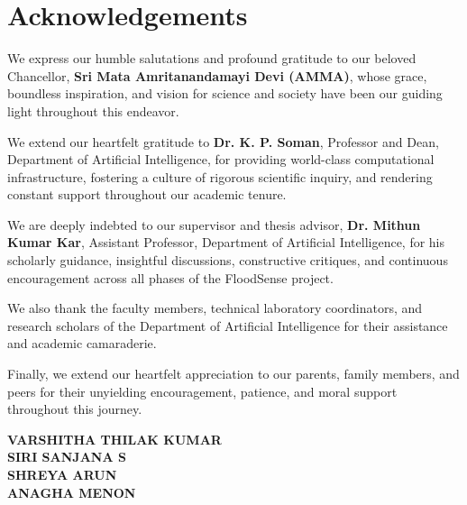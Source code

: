 \documentclass[a4paper, 12pt]{report}
\theoremstyle{definition}
\begin{document}
	\chapter*{Acknowledgements}
	We express our humble salutations and profound gratitude to our beloved Chancellor, \textbf{Sri Mata Amritanandamayi Devi (AMMA)}, whose grace, boundless inspiration, and vision for science and society have been our guiding light throughout this endeavor.

	We extend our heartfelt gratitude to \textbf{Dr. K. P. Soman}, Professor and Dean, Department of Artificial Intelligence, for providing world-class computational infrastructure, fostering a culture of rigorous scientific inquiry, and rendering constant support throughout our academic tenure.

	We are deeply indebted to our supervisor and thesis advisor, \textbf{Dr. Mithun Kumar Kar}, Assistant Professor, Department of Artificial Intelligence, for his scholarly guidance, insightful discussions, constructive critiques, and continuous encouragement across all phases of the FloodSense project.

	We also thank the faculty members, technical laboratory coordinators, and research scholars of the Department of Artificial Intelligence for their assistance and academic camaraderie. 

	Finally, we extend our heartfelt appreciation to our parents, family members, and peers for their unyielding encouragement, patience, and moral support throughout this journey.
	
	\vspace{1.2cm}
	\begin{flushright}
		\textbf{VARSHITHA THILAK KUMAR}\\
		\textbf{SIRI SANJANA S}\\
		\textbf{SHREYA ARUN}\\
		\textbf{ANAGHA MENON}
	\end{flushright}

	\tableofcontents
	\listoffigures
	\listoftables
	
	\newpage
\end{document}
